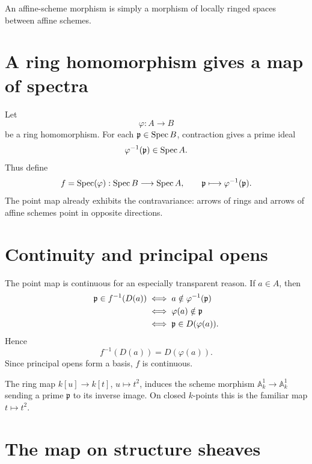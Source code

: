 An affine-scheme morphism is simply a morphism of locally ringed spaces between affine
schemes.



\section{A ring homomorphism gives a map of spectra}

Let
\[
\varphi:A\longrightarrow B
\]
be a ring homomorphism.  For each $\mathfrak p\in\operatorname{Spec} B$, contraction gives a prime ideal
\[
\varphi^{-1}(\mathfrak p)\in\operatorname{Spec} A.
\]
Thus define
\[
f=\operatorname{Spec}(\varphi):\operatorname{Spec} B\longrightarrow\operatorname{Spec} A,
\qquad
\mathfrak p\longmapsto\varphi^{-1}(\mathfrak p).
\]
The point map already exhibits the contravariance: arrows of rings and arrows of affine
schemes point in opposite directions.



\section{Continuity and principal opens}

The point map is continuous for an especially transparent reason.  If $a\in A$, then
\[
\begin{aligned}
\mathfrak p\in f^{-1}(D(a))
&\iff a\notin\varphi^{-1}(\mathfrak p)\\
&\iff \varphi(a)\notin\mathfrak p\\
&\iff \mathfrak p\in D(\varphi(a)).
\end{aligned}
\]
Hence
\[
\boxed{f^{-1}(D(a))=D(\varphi(a)).}
\]
Since principal opens form a basis, $f$ is continuous.



\begin{example}\label{ex:vi19-expand-01}
The ring map $k[u]\to k[t]$, $u\mapsto t^2$, induces the scheme morphism $\mathbb A^1_k\to\mathbb A^1_k$ sending a prime $\mathfrak p$ to its inverse image.  On closed $k$-points this is the familiar map $t\mapsto t^2$.
\end{example}
\section{The map on structure sheaves}

